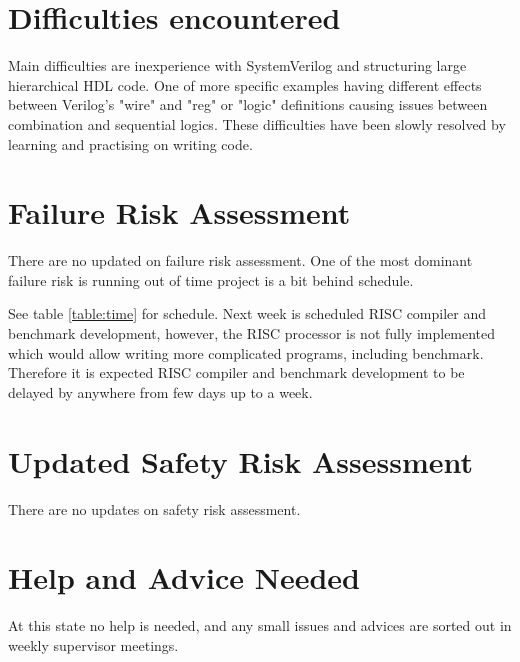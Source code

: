 \documentclass[a4paper,11pt]{article}
\begin{document}
\section{Difficulties encountered}
Main difficulties are inexperience with SystemVerilog and structuring large hierarchical HDL code. 
One of more specific examples having different effects between Verilog's "wire" and "reg" or "logic" definitions causing issues between combination and sequential logics. These difficulties have been slowly resolved by learning and practising on writing code. 

\section{Failure Risk Assessment}
There are no updated on failure risk assessment. One of the most dominant failure risk is running out of time project is a bit behind schedule. 

See table \ref{table:time} for schedule. Next week is scheduled RISC compiler and benchmark development, however, the RISC processor is not fully implemented which would allow writing more complicated programs, including benchmark. Therefore it is expected RISC compiler and benchmark development to be delayed by anywhere from few days up to a week.  

\section{Updated Safety Risk Assessment}
There are no updates on safety risk assessment.

\section{Help and Advice Needed}
At this state no help is needed, and any small issues and advices are sorted out in weekly supervisor meetings.
\end{document}
